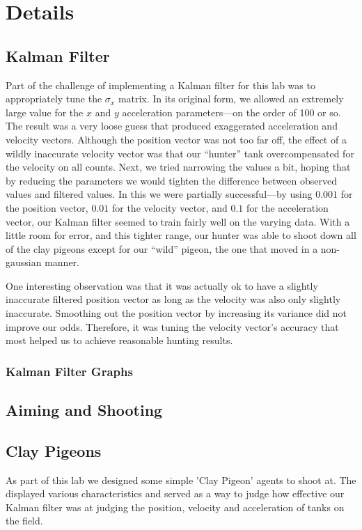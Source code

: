 \chapter{Details}\label{chap:details}
\section{Kalman Filter}
Part of the challenge of implementing a Kalman filter for this lab was to appropriately tune the $\sigma_x$ matrix.  In its original form, we allowed an extremely large value for the $x$ and $y$ acceleration parameters---on the order of 100 or so.  The result was a very loose guess that produced exaggerated acceleration and velocity vectors.  Although the position vector was not too far off, the effect of a wildly inaccurate velocity vector was that our ``hunter'' tank overcompensated for the velocity on all counts.  Next, we tried narrowing the values a bit, hoping that by reducing the parameters we would tighten the difference between observed values and filtered values.  In this we were partially successful---by using $0.001$ for the position vector, $0.01$ for the velocity vector, and $0.1$ for the acceleration vector, our Kalman filter seemed to train fairly well on the varying data.  With a little room for error, and this tighter range, our hunter was able to shoot down all of the clay pigeons except for our ``wild'' pigeon, the one that moved in a non-gaussian manner.

One interesting observation was that it was actually ok to have a slightly inaccurate filtered position vector as long as the velocity was also only slightly inaccurate.  Smoothing out the position vector by increasing its variance did not improve our odds.  Therefore, it was tuning the velocity vector's accuracy that most helped us to achieve reasonable hunting results.
\subsection{Kalman Filter Graphs}

\section{Aiming and Shooting}

\section{Clay Pigeons}
As part of this lab we designed some simple 'Clay Pigeon' agents to shoot at.  The displayed various characteristics and served as a way to judge how effective our Kalman filter was at judging the position, velocity and acceleration of tanks on the field.
